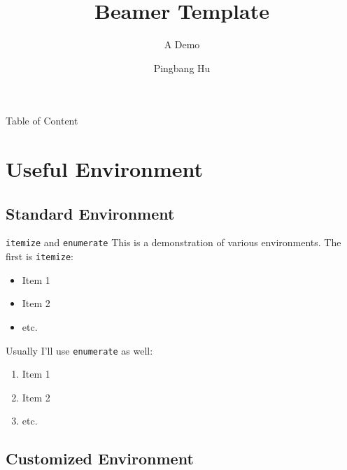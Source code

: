 \documentclass[aspectratio=169, xcolor={dvipsnames}, hyperref={colorlinks=true,linkcolor=Dandelion,urlcolor=magenta,citecolor=violet, hyperfootnotes=true}]{beamer}
\title[\cite{Hu_LaTeX-Template}]{Beamer Template}
\subtitle{A Demo}
\institute[UIUC]{University of Illinois Urbana-Champaign}
\author{Pingbang Hu}
\begin{document}
\begin{frame}
    \titlepage
\end{frame}

\begin{frame}{Table of Content}
    \tableofcontents[hideallsubsections]
\end{frame}


\section{Useful Environment}
\subsection{Standard Environment}
\begin{frame}{\texttt{itemize} and \texttt{enumerate}}
    This is a demonstration of various environments. The first is \texttt{itemize}:

    \begin{itemize}
        \item Item 1
        \item Item 2
        \item etc.
    \end{itemize}

    Usually I'll use \texttt{enumerate} as well:

    \begin{enumerate}
        \item Item 1
        \item Item 2
        \item etc.
    \end{enumerate}
\end{frame}

\subsection{Customized Environment}
\end{document}
